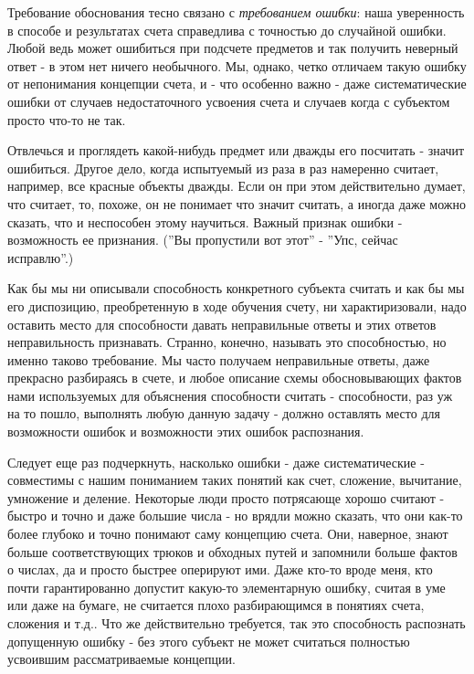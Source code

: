\documentclass{book}
\begin{document}
Требование обоснования тесно связано с \textit{требованием ошибки}: наша уверенность в способе и результатах счета справедлива с точностью до случайной ошибки. Любой ведь может ошибиться при подсчете предметов и так получить неверный ответ - в этом нет ничего необычного. Мы, однако, четко отличаем такую ошибку от непонимания концепции счета, и - что особенно важно - даже систематические ошибки от случаев недостаточного усвоения счета и случаев когда с субъектом просто что-то не так.

Отвлечься и проглядеть какой-нибудь предмет или дважды его посчитать - значит ошибиться. Другое дело, когда испытуемый из раза в раз намеренно считает, например, все красные объекты дважды. Если он при этом действительно думает, что считает, то, похоже, он не понимает что значит считать, а иногда даже можно сказать, что и неспособен этому научиться. Важный признак ошибки - возможность ее признания. (''Вы пропустили вот этот'' - ''Упс, сейчас исправлю''.)

Как бы мы ни описывали способность конкретного субъекта считать и как бы мы его диспозицию, преобретенную в ходе обучения счету, ни характиризовали, надо оставить место для способности давать неправильные ответы и этих ответов неправильность признавать. Странно, конечно, называть это способностью, но именно таково требование. Мы часто получаем неправильные ответы, даже прекрасно разбираясь в счете, и любое описание схемы обосновывающих фактов нами используемых для объяснения способности считать - способности, раз уж на то пошло, выполнять любую данную задачу - должно оставлять место для возможности ошибок и возможности этих ошибок распознания.

Следует еще раз подчеркнуть, насколько ошибки - даже систематические - совместимы с нашим пониманием таких понятий как счет, сложение, вычитание, умножение и деление. Некоторые люди просто потрясающе хорошо считают - быстро и точно и даже большие числа - но врядли можно сказать, что они как-то более глубоко и точно понимают саму концепцию счета. Они, наверное, знают больше соответствующих трюков и обходных путей и запомнили больше фактов о числах, да и просто быстрее оперируют ими. Даже кто-то вроде меня, кто почти гарантированно допустит какую-то элементарную ошибку, считая в уме или даже на бумаге, не считается плохо разбирающимся в понятиях счета, сложения и т.д.. Что же действительно требуется, так это способность распознать допущенную ошибку - без этого субъект не может считаться полностью усвоившим рассматриваемые концепции.
\end{document}
